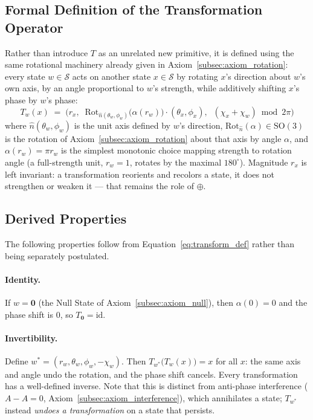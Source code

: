 \documentclass[12pt, a4paper]{article}
\begin{document}
\subsection{Formal Definition of the Transformation Operator}
\label{subsec:transform_definition}
Rather than introduce $T$ as an unrelated new primitive, it is defined
using the same rotational machinery already given in
Axiom~\ref{subsec:axiom_rotation}: every state $w \in \mathcal{S}$
acts on another state $x \in \mathcal{S}$ by rotating $x$'s direction
about $w$'s own axis, by an angle proportional to $w$'s strength, while
additively shifting $x$'s phase by $w$'s phase:
\begin{equation}
    T_w(x) \;=\; \Big(r_x,\;\; \mathrm{Rot}_{\hat n(\theta_w,\phi_w)}\!\big(\alpha(r_w)\big)\cdot(\theta_x,\phi_x),\;\; (\chi_x + \chi_w) \bmod 2\pi\Big)
    \label{eq:transform_def}
\end{equation}
where $\hat n(\theta_w,\phi_w)$ is the unit axis defined by $w$'s
direction, $\mathrm{Rot}_{\hat n}(\alpha) \in \mathrm{SO}(3)$ is the
rotation of Axiom~\ref{subsec:axiom_rotation} about that axis by angle
$\alpha$, and $\alpha(r_w) = \pi r_w$ is the simplest monotonic choice
mapping strength to rotation angle (a full-strength unit, $r_w = 1$,
rotates by the maximal $180^\circ$). Magnitude $r_x$ is left invariant:
a transformation reorients and recolors a state, it does not
strengthen or weaken it --- that remains the role of $\oplus$.

\subsection{Derived Properties}
\label{subsec:transform_properties}
The following properties follow from Equation~\eqref{eq:transform_def}
rather than being separately postulated.

\paragraph{Identity.} If $w = \mathbf{0}$ (the Null State of
Axiom~\ref{subsec:axiom_null}), then $\alpha(0) = 0$ and the phase
shift is $0$, so $T_{\mathbf{0}} = \mathrm{id}$.

\paragraph{Invertibility.} Define $w^{*} = (r_w, \theta_w, \phi_w, -\chi_w)$.
Then $T_{w^{*}}\!\big(T_w(x)\big) = x$ for all $x$: the same axis and
angle undo the rotation, and the phase shift cancels. Every
transformation has a well-defined inverse. Note that this is distinct
from anti-phase interference ($A - A = 0$, Axiom~\ref{subsec:axiom_interference}),
which annihilates a state; $T_{w^{*}}$ instead \emph{undoes a
transformation} on a state that persists.
\end{document}
